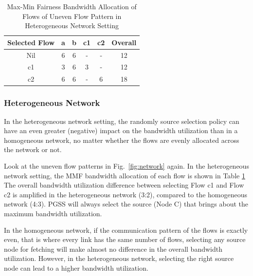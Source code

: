 \documentclass[10pt,journal,compsoc]{IEEEtran}
\begin{document}
\begin{table}[!t]
\renewcommand{\arraystretch}{1}
\caption{Max-Min Fairness Bandwidth Allocation of Flows of Uneven Flow Pattern in Heterogeneous Network Setting}
\label{table:heteUneven}
\centering
\begin{tabularx}{.35\textwidth}{c||c|c|c|c|c}
\hline
\textbf{Selected Flow} & \textbf{a} & \textbf{b} & \textbf{c1} & \textbf{c2} & \textbf{Overall}\\
\hline
Nil &6&6&-&-&12\\
\hline
c1 &3&6&3&-&12\\
\hline
c2 &6&6&-&6&18\\
\hline
\end{tabularx}
\end{table}

\subsubsection{Heterogeneous Network}
In the heterogeneous network setting, the randomly source selection policy
can have an even greater (negative) impact on the
bandwidth utilization than in a homogeneous network, 
no matter whether the flows are evenly allocated across the network or not.

Look at the uneven flow patterns in Fig.~\ref{fig:network} again. 
In the heterogeneous network setting, 
the MMF bandwidth allocation of each flow is shown in Table \ref{table:heteUneven}
The overall bandwidth utilization difference between selecting Flow c1 and Flow c2 is amplified in the heterogeneous network (3:2),
compared to the homogeneous network (4:3).
PGSS will always select the source (Node C) that brings about the maximum
bandwidth utilization.

In the homogeneous network, if the communication pattern of the flows
is exactly even, that is
where every link has the same number of flows, selecting any source
node for fetching
will make almost no difference in the overall bandwidth utilization. 
However, in the heterogeneous network, selecting the right source node
can lead to a higher bandwidth utilization.
\end{document}
